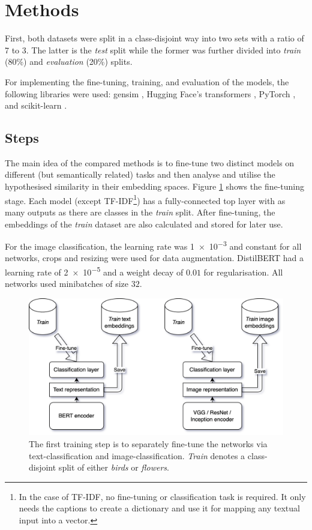 \section{Methods}

First, both datasets were split in a class-disjoint way into two sets with a ratio of 7 to 3. The latter is the \textit{test} split while the former was further divided into \textit{train} (80\%) and \textit{evaluation} (20\%) splits.

For implementing the fine-tuning, training, and evaluation of the models, the following libraries were used: gensim \cite{vrehuuvrek2011gensim}, Hugging Face's transformers \cite{wolf2019huggingface}, PyTorch \cite{paszke2019pytorch}, and scikit-learn \cite{pedregosa2011scikit}.

\subsection{Steps}

The main idea of the compared methods is to fine-tune two distinct models on different (but semantically related) tasks and then analyse and utilise the hypothesised similarity in their embedding spaces. Figure \ref{fig:fine-tune} shows the fine-tuning stage. Each model (except TF-IDF\footnote{In the case of TF-IDF, no fine-tuning or classification task is required. It only needs the captions to create a dictionary and use it for mapping any textual input into a vector.}) has a fully-connected top layer with as many outputs as there are classes in the \textit{train} split. After fine-tuning, the embeddings of the \textit{train} dataset are also calculated and stored for later use.

For the image classification, the learning rate was \num{1e-3} and constant for all networks, crops and resizing were used for data augmentation. DistilBERT had a learning rate of \num{2e-5} and a weight decay of $0.01$ for regularisation. All networks used minibatches of size $32$.

\begin{figure}
  \centering
  \includegraphics[width=1 \linewidth]{figures/finetune.drawio.png}
  \caption{The first training step is to separately fine-tune the networks via text-classification and image-classification. \textit{Train} denotes a class-disjoint split of either \textit{birds} or \textit{flowers}.}
  \label{fig:fine-tune}
\end{figure}

